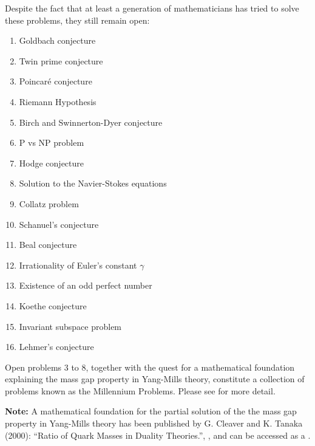\documentclass[12pt]{article}
\begin{document}
Despite the fact that at least a generation of mathematicians has tried to solve these problems, they still remain open:

\begin{enumerate}
\item Goldbach conjecture
\item Twin prime conjecture
\item Poincar\'e conjecture
\item Riemann Hypothesis
\item Birch and Swinnerton-Dyer conjecture
\item P vs NP problem
\item Hodge conjecture
\item Solution to the Navier-Stokes equations
\item Collatz problem
\item Schanuel's conjecture
\item Beal conjecture
\item Irrationality of Euler's constant $\gamma$
\item Existence of an odd perfect number
\item Koethe conjecture
\item Invariant subspace problem
\item Lehmer's conjecture
\end{enumerate}

Open problems 3 to 8, together with the quest for a mathematical foundation explaining the mass gap property in Yang-Mills theory, constitute a collection of problems known as the Millennium Problems.  Please see  for more detail.

\textbf{Note:}
A mathematical foundation for the partial solution of the the mass gap property in Yang-Mills theory has been published by G. Cleaver and K. Tanaka (2000): ``Ratio of Quark Masses in Duality Theories.'',
, and can be accessed as a 
 .

\end{document}
